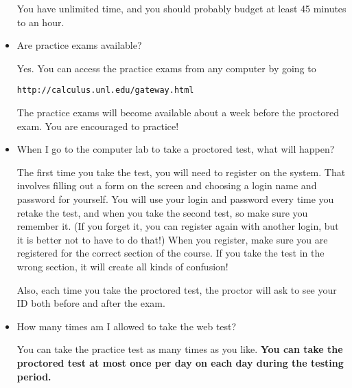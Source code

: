\documentclass[11pt]{article}
\begin{document}
\begin{itemize}
You have unlimited time, and you should probably budget at least 45
minutes to an hour.

\item Are practice exams available?

Yes.  You can access the practice exams from any computer by going to

\centerline{\tt http://calculus.unl.edu/gateway.html}  

\noindent The practice exams will become available about a week before the
proctored exam.  You are encouraged to practice!

\item When I go to the computer lab to take a proctored test, what
will happen?

The first time you take the test, you will need to register on the
system. That involves filling out a form on the screen and choosing a
login name and password for yourself. You will use your login and
password every time you retake the test, and when you take the second
test, so make sure you remember it. (If you forget it, you can
register again with another login, but it is better not to have to do
that!)  When you register, make sure you are registered for the
correct section of the course. If you take the test in the wrong
section, it will create all kinds of confusion!

Also, each time you take the proctored test, the proctor will ask to
see your ID both before and after the exam.

\item How many times am I allowed to take the web test?

You can take the practice test as many times as you like.  {\bf You can
take the proctored test at most once per day on each day during the
testing period.}

\end{itemize}
\end{document}
